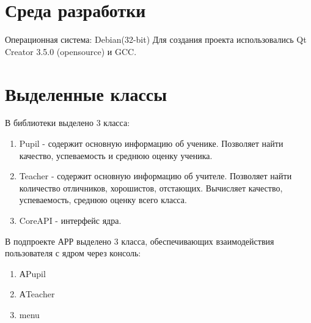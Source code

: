 \documentclass[12pt,a4paper]{report}
\begin{document}
\section{Среда разработки}
Операционная система: Debian(32-bit)
Для создания проекта использовались Qt Creator 3.5.0 (opensource) и GCC.

\section{Выделенные классы}
В библиотеки выделено 3 класса:
\begin{enumerate}
\item Pupil - содержит основную информацию об ученике. Позволяет найти качество, успеваемость и среднюю оценку ученика.
\item Teacher - содержит основную информацию об учителе. Позволяет найти количество отличников, хорошистов, отстающих. Вычисляет качество, успеваемость, среднюю оценку всего класса.
\item CoreAPI - интерфейс ядра.
\end{enumerate}

В подпроекте АРР выделено 3 класса, обеспечивающих взаимодействия пользователя с ядром через консоль:
\begin{enumerate}
\item АPupil
\item АTeacher 
\item menu
\end{enumerate} 
\end{document}
